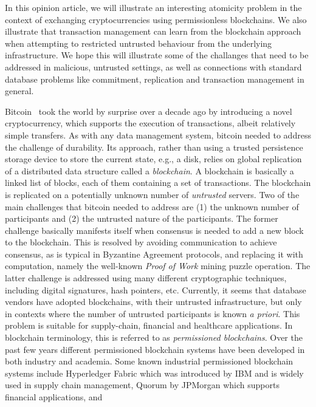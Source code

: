 \documentclass[11pt]{article}
\begin{document}
In this opinion article, we will illustrate an interesting atomicity problem in the context of exchanging cryptocurrencies using permissionless blockchains. We also illustrate that transaction management can learn from the blockchain approach when attempting to restricted untrusted behaviour from the underlying infrastructure.  We hope this will illustrate some of the challanges that need to be addressed in malicious, untrusted settings, as well as connections with standard database problems like commitment, replication and transaction management in general. 

Bitcoin~\cite{nakamoto2008bitcoin} took the world by surprise over a decade ago by introducing a novel cryptocurrency, which supports the execution of transactions, albeit relatively simple transfers.  As with any data management system, bitcoin needed to address the challenge of durability.  Its approach, rather than using a trusted persistence storage device to store the current state, e.g., a disk, relies on global replication of a distributed data structure called a {\em blockchain}.  A blockchain is basically a linked list of blocks, each of them containing a set of transactions.  The blockchain is replicated on a potentially unknown number of {\em untrusted} servers.
Two of the main challenges that bitcoin needed to address are (1) the unknown number of participants and (2) the untrusted nature of the participants.  The former challenge basically manifests itself when consensus is needed to add a new block to the blockchain.  This is resolved by avoiding communication to achieve consensus, as is typical in Byzantine Agreement protocols, and replacing it with computation, namely the well-known {\em Proof of Work} mining puzzle operation.  The latter challenge is addressed using many different cryptographic techniques, including digital signatures, hash pointers, etc.  Currently, it seems that database vendors have adopted blockchains, with their untrusted infrastructure, but only in contexts where the number of untrusted participants is known {\em a priori}.  This problem is suitable for supply-chain, financial and healthcare applications. In blockchain terminology, this is referred to as {\em permissioned blockchains}.  Over the past few years different permissioned blockchain systems have been developed in both
industry and academia.
Some known industrial permissioned blockchain systems include Hyperledger Fabric \cite{androulaki2018hyperledger} which was introduced by IBM and is widely used in supply chain management,
Quorum \cite{morgan2016quorum} by JPMorgan which supports financial applications, and
\end{document}

